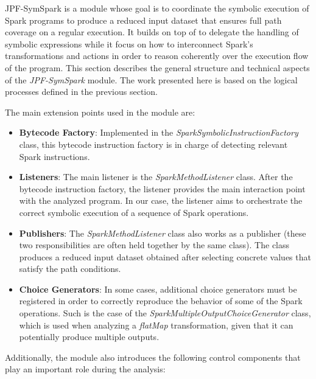 \label{sec:jpf-symspark}

JPF-SymSpark is a \jpf{} module whose goal is to coordinate the symbolic execution of Spark programs to produce a reduced input dataset that ensures full path coverage on a regular execution. It builds on top of \spf{} to delegate the handling of symbolic expressions while it focus on how to interconnect Spark's transformations and actions in order to reason coherently over the execution flow of the program. This section describes the general structure and technical aspects of the \textit{JPF-SymSpark} module. The work presented here is based on the logical processes defined in the previous section. 

The main \jpf{} extension points used in the module are:

\begin{itemize}
	\item \textbf{Bytecode Factory}: Implemented in the \textit{SparkSymbolicInstructionFactory} class, this bytecode instruction factory is in charge of detecting relevant Spark instructions.
	\item \textbf{Listeners}: The main listener is the \textit{SparkMethodListener} class. After the bytecode instruction factory, the listener provides the main interaction point with the analyzed program. In our case, the listener aims to orchestrate the correct symbolic execution of a sequence of Spark operations.
	\item \textbf{Publishers}: The \textit{SparkMethodListener} class also works as a publisher (these two responsibilities are often held together by the same class). The class produces a reduced input dataset obtained after selecting concrete values that satisfy the path conditions.
	\item \textbf{Choice Generators}: In some cases, additional choice generators must be registered in order to correctly reproduce the behavior of some of the Spark operations. Such is the case of the \textit{SparkMultipleOutputChoiceGenerator} class, which is used when analyzing a \textit{flatMap} transformation, given that it can potentially produce multiple outputs.
\end{itemize}

Additionally, the module also introduces the following control components that play an important role during the analysis:

